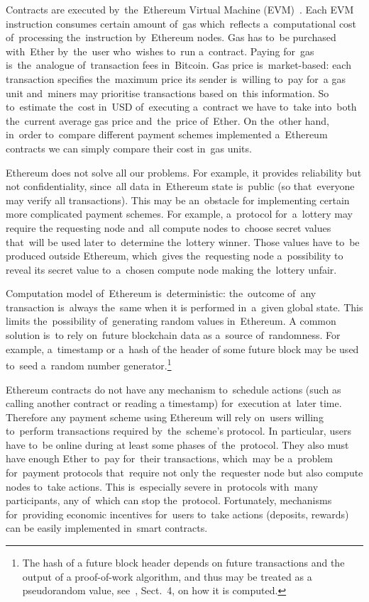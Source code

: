 \documentclass[a4paper]{article}
\begin{document}
    Contracts are executed by~the~Ethereum Virtual Machine (EVM)~\cite{WOOD}. Each EVM instruction consumes certain
    amount of~gas which~reflects a~computational cost of~processing the~instruction by~Ethereum nodes. Gas has to~be
    purchased with~Ether by~the~user who~wishes to~run a~contract. Paying for~gas is~the~analogue of~transaction fees
    in~Bitcoin. Gas price is~market-based: each transaction specifies the~maximum price its sender is~willing to~pay
    for~a gas unit and~miners may prioritise transactions based on~this information. So to~estimate the~cost in~USD
    of~executing a~contract we have to~take into~both the~current average gas price and~the~price of~Ether.
    On the~other hand, in~order to~compare different payment schemes implemented a~Ethereum contracts we can simply
    compare their cost in~gas units.

    Ethereum does not solve all our problems. For example, it provides reliability but not confidentiality, since~all
    data in~Ethereum state is~public (so that~everyone may verify all transactions). This may be an~obstacle for
    implementing certain more complicated payment schemes. For example, a~protocol for~a~lottery may require the
    requesting node and~all compute nodes to~choose secret values that~will be used later to~determine the~lottery
    winner. Those values have to~be produced outside Ethereum, which~gives the~requesting node a~possibility to
    reveal its secret value to~a~chosen compute node making the~lottery unfair.

    Computation model of~Ethereum is~deterministic: the~outcome of~any transaction is~always the~same when it is
    performed in~a~given global state. This limits the~possibility of~generating random values in~Ethereum.
    A common solution is~to rely on~future blockchain data as a~source of~randomness. For example, a~timestamp or
    a~hash of the header of some future block may be used to~seed a~random number generator.\footnote{The hash of a
      future block header depends on future transactions and the output of a proof-of-work algorithm,
      and thus may be treated as a pseudorandom value, see~\cite{WOOD}, Sect.~4, on how it is computed.}

    Ethereum contracts do not have any mechanism to~schedule actions (such as calling another contract or reading a
    timestamp) for~execution at~later time. Therefore any payment scheme using Ethereum will rely on~users willing
    to~perform transactions required by~the~scheme's protocol. In particular, users have to~be online during at
    least some phases of~the~protocol. They also must have enough Ether to~pay for~their transactions, which~may be
    a~problem for~payment protocols that~require not only the~requester node but also compute nodes to~take actions.
    This is~especially severe in~protocols with~many participants, any of~which can stop the~protocol.
    Fortunately, mechanisms for~providing economic incentives for~users to~take actions (deposits, rewards)
    can be easily implemented in~smart contracts.
\end{document}
